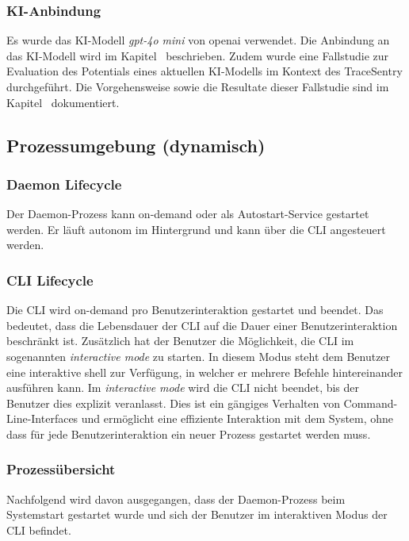 \documentclass[a4paper,12pt]{report}
\begin{document}
    \subsubsection{KI-Anbindung}\label{subsubsec:spezifikation-ki-anbindung}
    Es wurde das KI-Modell \textit{\gls{gpt}-4o mini} von \gls{openai} verwendet.
    Die Anbindung an das KI-Modell wird im Kapitel~ beschrieben.
    Zudem wurde eine Fallstudie zur Evaluation des Potentials eines aktuellen KI-Modells im Kontext des TraceSentry durchgeführt.
    Die Vorgehensweise sowie die Resultate dieser Fallstudie sind im Kapitel~ dokumentiert.

    \clearpage

    \subsection{Prozessumgebung (dynamisch)}\label{subsec:prozessumgebung}

    \subsubsection{Daemon Lifecycle}
    Der Daemon-Prozess kann on-demand oder als Autostart-Service gestartet werden.
    Er läuft autonom im Hintergrund und kann über die CLI angesteuert werden.

    \subsubsection{CLI Lifecycle}
    Die CLI wird on-demand pro Benutzerinteraktion gestartet und beendet.
    Das bedeutet, dass die Lebensdauer der CLI auf die Dauer einer Benutzerinteraktion beschränkt ist.
    Zusätzlich hat der Benutzer die Möglichkeit, die CLI im sogenannten \textit{interactive mode} zu starten.
    In diesem Modus steht dem Benutzer eine interaktive \gls{shell} zur Verfügung, in welcher er mehrere Befehle hintereinander ausführen kann.
    Im \textit{interactive mode} wird die CLI nicht beendet, bis der Benutzer dies explizit veranlasst.
    Dies ist ein gängiges Verhalten von Command-Line-Interfaces und ermöglicht eine effiziente Interaktion mit dem System, ohne dass für jede Benutzerinteraktion ein neuer Prozess gestartet werden muss.

    \subsubsection{Prozessübersicht}
    Nachfolgend wird davon ausgegangen, dass der Daemon-Prozess beim Systemstart gestartet wurde und sich der Benutzer im interaktiven Modus der CLI befindet.
\end{document}
